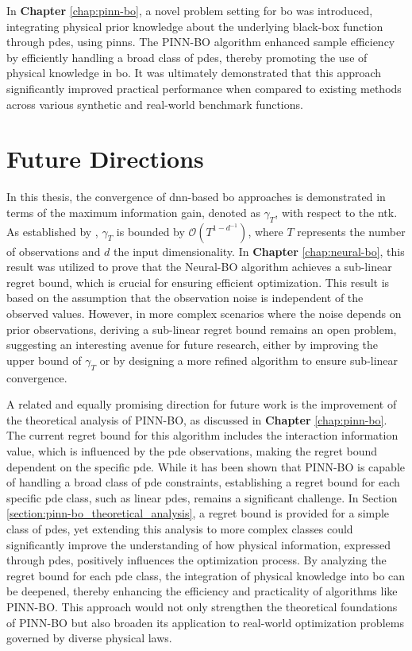In \textbf{Chapter} \ref{chap:pinn-bo}, a novel problem setting for \ac{bo} was introduced, integrating physical prior knowledge about the underlying black-box function through \acp{pde}, using \acp{pinn}. The PINN-BO algorithm enhanced sample efficiency by efficiently handling a broad class of \acp{pde}, thereby promoting the use of physical knowledge in \ac{bo}. It was ultimately demonstrated that this approach significantly improved practical performance when compared to existing methods across various synthetic and real-world benchmark functions.
 
\section{Future Directions}
In this thesis, the convergence of \ac{dnn}-based \ac{bo} approaches is demonstrated in terms of the maximum information gain, denoted as $\gamma_T$, with respect to the \ac{ntk}. As established by \citet{kassraie2022neural}, $\gamma_T$ is bounded by $\mathcal{O}(T^{1-d^{-1}})$, where $T$ represents the number of observations and $d$ the input dimensionality. In \textbf{Chapter} \ref{chap:neural-bo}, this result was utilized to prove that the Neural-BO algorithm achieves a sub-linear regret bound, which is crucial for ensuring efficient optimization. This result is based on the assumption that the observation noise is independent of the observed values. However, in more complex scenarios where the noise depends on prior observations, deriving a sub-linear regret bound remains an open problem, suggesting an interesting avenue for future research, either by improving the upper bound of $\gamma_T$ or by designing a more refined algorithm to ensure sub-linear convergence.

A related and equally promising direction for future work is the improvement of the theoretical analysis of PINN-BO, as discussed in \textbf{Chapter} \ref{chap:pinn-bo}. The current regret bound for this algorithm includes the interaction information value, which is influenced by the \ac{pde} observations, making the regret bound dependent on the specific \ac{pde}. While it has been shown that PINN-BO is capable of handling a broad class of \ac{pde} constraints, establishing a regret bound for each specific \ac{pde} class, such as linear \acp{pde}, remains a significant challenge. In Section \ref{section:pinn-bo_theoretical_analysis}, a regret bound is provided for a simple class of \acp{pde}, yet extending this analysis to more complex classes could significantly improve the understanding of how physical information, expressed through \acp{pde}, positively influences the optimization process. By analyzing the regret bound for each \ac{pde} class, the integration of physical knowledge into \acl{bo} can be deepened, thereby enhancing the efficiency and practicality of algorithms like PINN-BO. This approach would not only strengthen the theoretical foundations of PINN-BO but also broaden its application to real-world optimization problems governed by diverse physical laws.      

